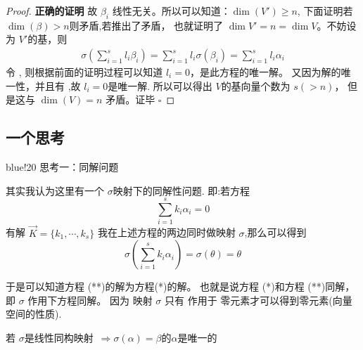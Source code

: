 \begin{proof}{\bf 正确的证明}
    \bigskip
    故 $\beta_i$ 线性无关。所以可以知道：$\dim(V')\ge n$, 下面证明若 $\dim(\beta)> n$则矛盾,若推出了矛盾，
    也就证明了 $\dim{V'} = n = \dim{V}$。不妨设 \seq[s]{\beta}为 $V'$的基，则
    \begin{align*}
        \sigma(\sum_{i=1}^{s}{l_i\beta_i}) = \sum_{i=1}^{s}{l_i\sigma(\beta_i)} = \sum_{i=1}^{s}{l_i\alpha_i}
    \end{align*}
    令  , 则根据前面的证明过程可以知道 $l_i=0$，是此方程的唯一解。
    又因为解的唯一性，并且有 ,故 $l_i=0$是唯一解.
    所以可以得出 $V$的基向量个数为 $s(>n)$， 但是这与 $\dim(V)=n$ 矛盾。\textsf{证毕} $\square$
\end{proof}

\subsection{一个思考}
\begin{formal}{blue!20}
    \textsf{思考一：同解问题}\par 
    \ttfamily
    其实我认为这里有一个 $\sigma$映射下的同解性问题. 即:若方程
    \[
        \sum_{i=1}^{s}{k_i\alpha_i} = 0 \tag{*}
    \]
    有解 $\vec{K} = \{k_1, \cdots, k_s\}$
    我在上述方程的两边同时做映射 $\sigma$,那么可以得到 
    \[
        \sigma(\sum_{i=1}^{s}{k_i\alpha_i}) = \sigma(\theta) = \theta     \tag{**}
    \]

    于是可以知道方程 (**)的解为方程(*)的解。
    也就是说方程 (*)和方程 (**)同解， 即 $\sigma$ 作用下方程同解。
    因为 映射 $\sigma$ 只有
    作用于 零元素才可以得到零元素(向量空间的性质).
    \begin{center}
        若 $\sigma$是线性同构映射~$\Rightarrow \sigma(\alpha)= \beta$的$\alpha$是唯一的
    \end{center}
\end{formal} 


